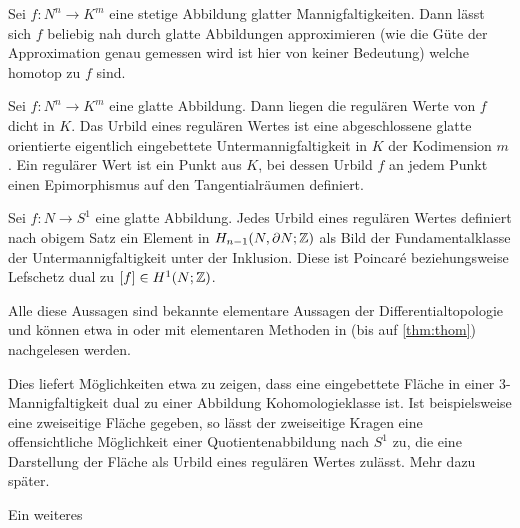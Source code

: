 	\begin{thm}
		Sei $f:N^n\to K^m$ eine stetige Abbildung glatter Mannigfaltigkeiten. Dann lässt sich $f$ beliebig nah durch glatte Abbildungen approximieren (wie die Güte der Approximation genau gemessen wird ist hier von keiner Bedeutung) welche homotop zu $f$ sind.
	\end{thm}
	\begin{thm}
		Sei $f:N^n \to K^m$ eine glatte Abbildung. Dann liegen die regulären Werte von $f$ dicht in $K$. Das Urbild eines regulären Wertes ist eine abgeschlossene glatte orientierte eigentlich eingebettete Untermannigfaltigkeit in $K$ der Kodimension $m$. Ein regulärer Wert ist ein Punkt aus $K$, bei dessen Urbild $f$ an jedem Punkt einen Epimorphismus auf den Tangentialräumen definiert. 
	\end{thm}
	\begin{thm}[Thom]
	\label{thm:thom}
		Sei $f:N \to S^1$ eine glatte Abbildung. Jedes Urbild eines regulären Wertes definiert nach obigem Satz ein Element in $H_{n-1}(N,\partial N;\mathbb{Z})$ als Bild der Fundamentalklasse der Untermannigfaltigkeit unter der Inklusion. Diese ist Poincaré beziehungsweise Lefschetz dual zu $[f]\in H^1(N;\mathbb{Z})$.
	\end{thm}
	Alle diese Aussagen sind bekannte elementare Aussagen der Differentialtopologie und können etwa in \cite{Kreck.2010} oder mit elementaren Methoden in \cite{Hirsch.1991} (bis auf \ref{thm:thom}) nachgelesen werden. 
	
	Dies liefert Möglichkeiten etwa zu zeigen, dass eine eingebettete Fläche in einer 3-Mannigfaltigkeit dual zu einer Abbildung Kohomologieklasse ist. Ist beispielsweise eine zweiseitige Fläche gegeben, so lässt der zweiseitige Kragen eine offensichtliche Möglichkeit einer Quotientenabbildung nach $S^1$ zu, die eine Darstellung der Fläche als Urbild eines regulären Wertes zulässt. Mehr dazu später.
	
	\begin{bem}[Schnittzahlen]
		Ein weiteres 
	\end{bem}